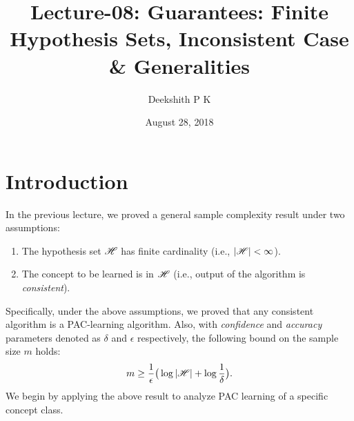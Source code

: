 \documentclass[a4paper,english,12pt]{article}
\title{Lecture-08: Guarantees: Finite Hypothesis Sets, Inconsistent Case \& Generalities}
\date{August 28, 2018}
\author{Deekshith P K}
\begin{document}
\maketitle
\section{Introduction}
In the previous lecture, we proved a general sample complexity result under two assumptions: 
\begin{enumerate}
\item The hypothesis set $\mathscr{H}$ has finite cardinality (i.e., $|\mathscr{H}|<\infty$).
\item The concept to be learned is in $\mathscr{H}$ (i.e., output of the algorithm is \textit{consistent}).
\end{enumerate}
Specifically, under the above assumptions, we proved that any consistent algorithm is a PAC-learning algorithm. Also, with \textit{confidence} and \textit{accuracy} parameters denoted as $\delta$ and $\epsilon$ respectively, the following bound on the sample size $m$ holds: $$m\geq \frac{1}{\epsilon}\big(\log |\mathscr{H}|+\log \frac{1}{\delta}\big).$$ 
We begin by applying the above result to analyze PAC learning of  a specific concept class.
\end{document}
